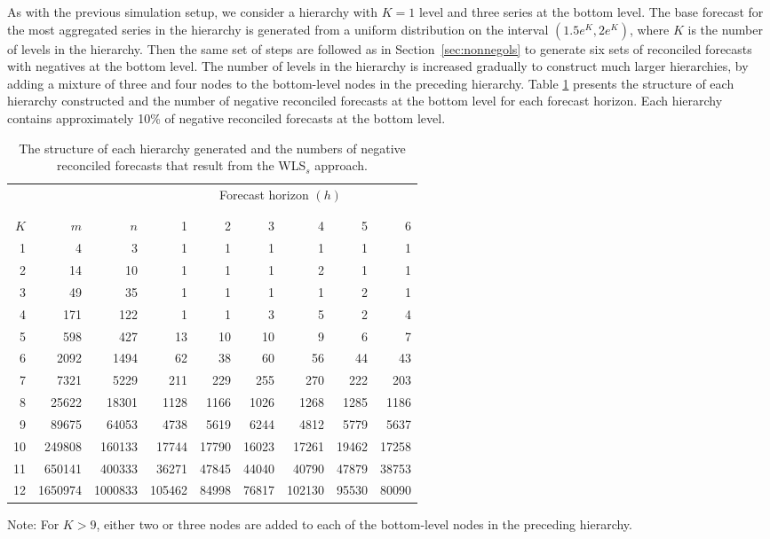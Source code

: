 \documentclass[11pt]{article}
\newcommand{\0}{\phantom{0}}
\begin{document}
As with the previous simulation setup, we consider a hierarchy with $K=1$ level and three series at the bottom level. The base forecast for the most aggregated series in the hierarchy is generated from a uniform distribution on the interval $(1.5e^{K}, 2e^{K})$, where $K$ is the number of levels in the hierarchy. Then the same set of steps are followed as in Section~\ref{sec:nonnegols} to generate six sets of reconciled forecasts with negatives at the bottom level. The number of levels in the hierarchy is increased gradually to construct much larger hierarchies, by adding a mixture of three and four nodes to the bottom-level nodes in the preceding hierarchy. Table \ref{tbl:negstrwls} presents the structure of each hierarchy constructed and the number of negative reconciled forecasts at the bottom level for each forecast horizon. Each hierarchy contains approximately 10\% of negative reconciled forecasts at the bottom level. 

\begin{table}[ht]
	\caption{The structure of each hierarchy generated and the numbers of negative reconciled forecasts that result from the WLS$_{s}$ approach.}
	\label{tbl:negstrwls}
	\centering
	\begin{threeparttable}
		\begin{tabular}{rrrrrrrrr}
			\toprule
			& & & \multicolumn{6}{c}{Forecast horizon $(h)$}\\[-0.3cm]\\\cline{4-9}\\[-0.3cm]
			$K$ & $m$ & $n$ & 1 & 2 & 3 & 4 & 5 & 6\\ 
			\midrule
			1 & 4 & 3 & 1 & 1 & 1 & 1 & 1 & 1\\
			2 & 14 & 10 & 1 & 1 & 1 & 2 & 1 & 1 \\
			3 & 49 & 35 & 1 & 1 & 1 & 1 & 2 & 1 \\
			4 & 171 & 122 & 1 & 1 & 3 & 5 & 2 & 4 \\
			5 & 598 & 427 & 13 & 10 & 10 & 9 & 6 & 7 \\
			6 & 2092 & 1494 & 62 & 38 & 60 & 56 & 44 & 43 \\
			7 & 7321 & 5229 & 211 & 229 & 255 & 270 & 222 & 203 \\
			8 & 25622 & 18301 & 1128 & 1166 & 1026 & 1268 & 1285 & 1186 \\
			9 & 89675 & 64053 & 4738 & 5619 & 6244 & 4812 & 5779 & 5637 \\
			10 & 249808 & 160133 & 17744 & 17790 & 16023 & 17261 & 19462 & 17258 \\
			11 & 650141 & 400333 & 36271 & 47845 & 44040 & 40790 & 47879 & 38753 \\
			12 & 1650974 & 1000833 & 105462 & 84998 & 76817 & 102130 & 95530 & 80090 \\
			\bottomrule
		\end{tabular}
		\begin{tablenotes}
			\item [] Note: For $K > 9$, either two or three nodes are added to each of the bottom-level nodes in the preceding hierarchy.
		\end{tablenotes}
	\end{threeparttable}
\end{table}
\end{document}
